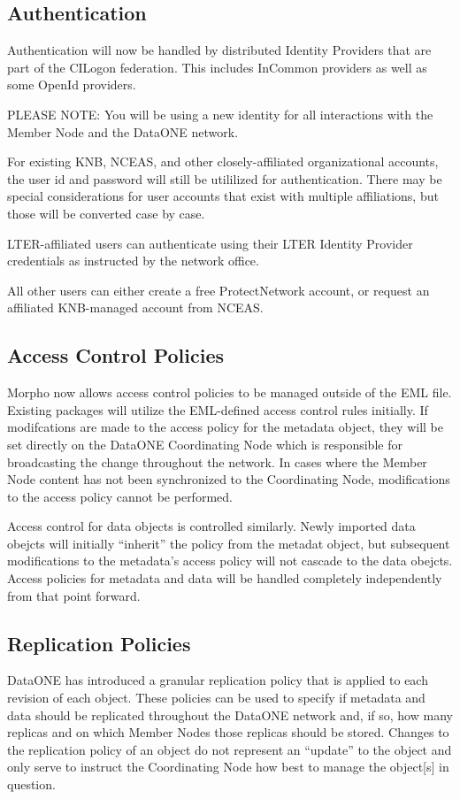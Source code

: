 \subsection{Authentication}

Authentication will now be handled by distributed Identity Providers 
that are part of the CILogon federation. This includes InCommon providers
as well as some OpenId providers.

PLEASE NOTE: You will be using a new identity for all interactions with 
the Member Node and the DataONE network.

For existing KNB, NCEAS, and other closely-affiliated organizational accounts, the user id 
and password will still be utililized for authentication. There may be special considerations 
for user accounts that exist with multiple affiliations, but those will be converted case by 
case.

LTER-affiliated users can authenticate using their LTER Identity Provider credentials
as instructed by the network office.

All other users can either create a free ProtectNetwork account, or request an affiliated 
KNB-managed account from NCEAS.

\subsection{Access Control Policies}

Morpho now allows access control policies to be managed outside of the EML
file. Existing packages will utilize the EML-defined access control rules initially.
If modifcations are made to the access policy for the metadata object, they will be set
directly on the DataONE Coordinating Node which is responsible for broadcasting the change
throughout the network. In cases where the Member Node content has not been synchronized
to the Coordinating Node, modifications to the access policy cannot be performed.

Access control for data objects is controlled similarly. Newly imported data obejcts
will initially ``inherit'' the policy from the metadat object, but subsequent modifications
to the metadata's access policy will not cascade to the data obejcts. Access policies for 
metadata and data will be handled completely independently from that point forward.

\subsection{Replication Policies}

DataONE has introduced a granular replication policy that is applied to each 
revision of each object. These policies can be used to specify if metadata and 
data should be replicated throughout the DataONE network and, if so, how many 
replicas and on which Member Nodes those replicas should be stored. 
Changes to the replication policy of an object do not represent an ``update'' to 
the object and only serve to instruct the Coordinating Node how best to 
manage the object[s] in question.
